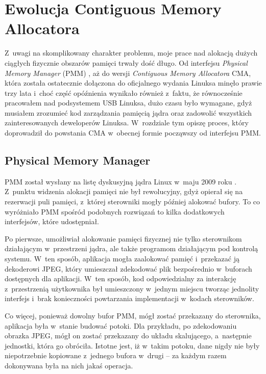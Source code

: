 \chapter{Ewolucja Contiguous Memory Allocatora}

Z~uwagi na skomplikowany charakter problemu, moje prace nad alokacją
dużych ciągłych fizycznie obszarów pamięci trwały dość długo.  Od
interfejsu \textit{Physical Memory Manager} (PMM)
\autocite{patch:pmm}, aż do wersji \textit{Contiguous Memory
  Allocatora} CMA, która została ostatecznie dołączona do oficjalnego
wydania Linuksa \autocite{patch:cma-24} minęło prawie trzy lata i~choć
część opóźnienia wynikało również z~faktu, że równocześnie pracowałem
nad podsystemem USB Linuksa, dużo czasu było wymagane, gdyż musiałem
zrozumieć kod zarządzania pamięcią jądra oraz zadowolić wszystkich
zainteresowanych deweloperów Linuksa.  W~rozdziale tym opiszę proces,
który doprowadził do powstania CMA w~obecnej formie począwszy od
interfejsu PMM.


\section{Physical Memory Manager}\label{sec:evo-pmm}

PMM został wysłany na listę dyskusyjną jądra Linux w~maju 2009 roku
\autocite{patch:pmm}.  Z~punktu widzenia alokacji pamięci nie był
rewolucyjny, gdyż opierał się na rezerwacji puli pamięci, z~której
sterowniki mogły później alokować bufory.  To co wyróżniało PMM
spośród podobnych rozwiązań to kilka dodatkowych interfejsów, które
udostępniał.

Po pierwsze, umożliwiał alokowanie pamięci fizycznej nie tylko
sterownikom działającym w~przestrzeni jądra, ale także programom
działającym pod kontrolą systemu.  W~ten sposób, aplikacja mogła
zaalokować pamięć i~przekazać ją dekoderowi JPEG, który umieszczał
zdekodować plik bezpośrednio w~buforach dostępnych dla
aplikacji. W~ten sposób, kod odpowiedzialny za interakcję
z~przestrzenią użytkownika był umieszczony w~jednym miejscu tworząc
jednolity interfejs i~brak konieczności powtarzania implementacji
w~kodach sterowników.

Co więcej, ponieważ dowolny bufor PMM, mógł zostać przekazany do
sterownika, aplikacja była w~stanie budować potoki.  Dla przykładu, po
zdekodowaniu obrazka JPEG, mógł on zostać przekazany do układu
skalującego, a~następnie jednostki, która go obróciła.  Istotne jest,
iż w~takim potoku, dane nigdy nie były niepotrzebnie kopiowane
z~jednego bufora w~drugi -- za każdym razem dokonywana była na nich
jakaś operacja.

